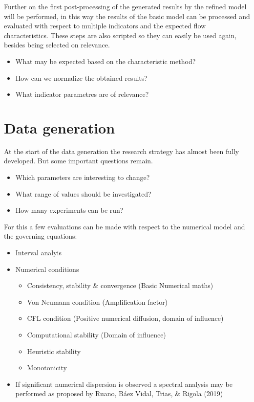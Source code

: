 Further on the first post-processing of the generated results by the
refined model will be performed, in this way the results of the basic
model can be processed and evaluated with respect to multiple indicators
and the expected flow characteristics. These steps are also scripted so
they can easily be used again, besides being selected on relevance.

\begin{itemize}
\tightlist
\item
  What may be expected based on the characteristic method?
\item
  How can we normalize the obtained results?
\item
  What indicator parametres are of relevance?
\end{itemize}

\section{Data generation}\label{data-generation}

At the start of the data generation the research strategy has almost
been fully developed. But some important questions remain.

\begin{itemize}
\tightlist
\item
  Which parameters are interesting to change?
\item
  What range of values should be investigated?
\item
  How many experiments can be run?
\end{itemize}

For this a few evaluations can be made with respect to the numerical
model and the governing equations:

\begin{itemize}
\tightlist
\item
  Interval analyis
\item
  Numerical conditions

  \begin{itemize}
  \tightlist
  \item
    Consistency, stability \& convergence (Basic Numerical maths)
  \item
    Von Neumann condition (Amplification factor)
  \item
    CFL condition (Positive numerical diffusion, domain of influence)
  \item
    Computational stability (Domain of influence)
  \item
    Heuristic stability
  \item
    Monotonicity
  \end{itemize}
\item
  If significant numerical dispersion is observed a spectral analysis
  may be performed as proposed by Ruano, Báez Vidal, Trias, \& Rigola
  (2019)
\end{itemize}

